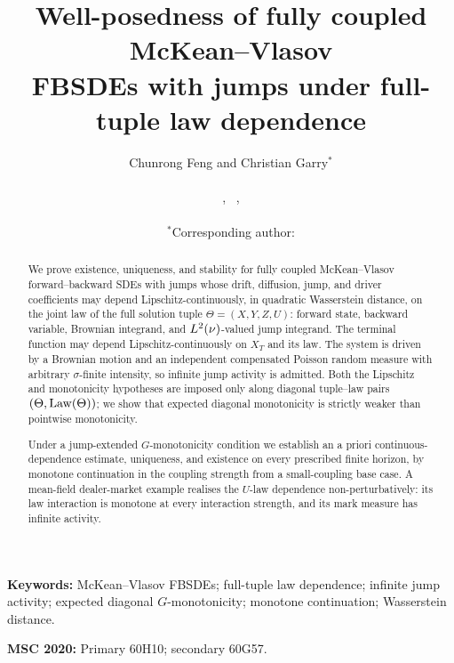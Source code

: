 \documentclass[12pt,a4paper]{article}
\title{Well-posedness of fully coupled McKean--Vlasov\\
FBSDEs with jumps under full-tuple law dependence}
\author{Chunrong Feng and Christian Garry$^{*}$\\[4pt]
\small \PaperDept\\[1pt]
\small \PaperStreet, \PaperCity\ \PaperPostcode, \PaperCountry\\[3pt]
\small \texttt{\PaperEmailFeng}\\[1pt]
\small $^{*}$Corresponding author: \texttt{\PaperEmailGarry}}
\date{}
\begin{document}
\maketitle
\begin{abstract}
We prove existence, uniqueness, and stability for fully coupled McKean--Vlasov
forward--backward SDEs with jumps whose drift, diffusion, jump, and driver coefficients
may depend Lipschitz-continuously, in quadratic Wasserstein distance, on the joint law of
the full solution tuple $\Theta=(X,Y,Z,U)$: forward state, backward variable, Brownian
integrand, and $L^2(\nu)$-valued jump integrand. The terminal function may depend
Lipschitz-continuously on $X_T$ and its law. The system is driven by a Brownian motion and an independent compensated Poisson
random measure with arbitrary $\sigma$-finite intensity, so infinite jump activity is
admitted.
Both the Lipschitz and monotonicity hypotheses are imposed only along diagonal
tuple--law pairs $(\Theta,\mathrm{Law}(\Theta))$; we show that expected diagonal monotonicity is
strictly weaker than pointwise monotonicity.

Under a jump-extended $G$-monotonicity condition we
establish an a priori continuous-dependence estimate, uniqueness, and existence on every
prescribed finite horizon, by monotone continuation in the coupling strength from a
small-coupling base case. A mean-field dealer-market example realises the $U$-law
dependence non-perturbatively: its law interaction is monotone at every interaction
strength, and its mark measure has infinite activity.
\end{abstract}

\smallskip
\noindent\textbf{Keywords:} McKean--Vlasov FBSDEs; full-tuple law dependence; infinite jump activity; expected diagonal $G$-monotonicity; monotone continuation; Wasserstein distance.

\noindent\textbf{MSC 2020:} Primary 60H10; secondary 60G57.









\end{document}
